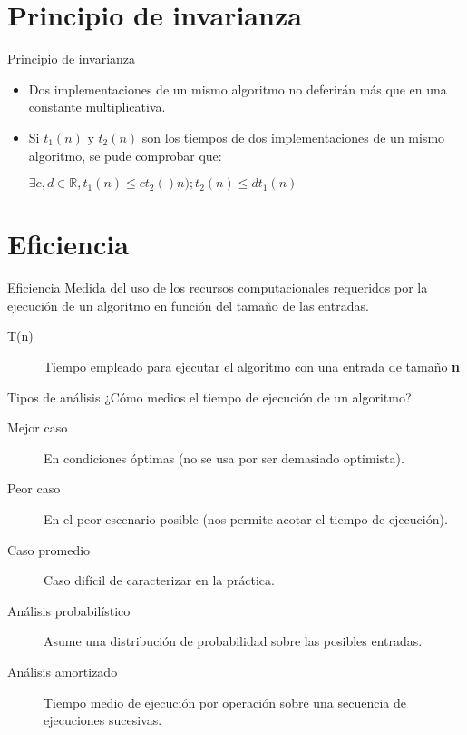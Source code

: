 \section{Principio de invarianza}

\begin{frame}[c]{Principio de invarianza}
  \begin{itemize}
    \item Dos implementaciones de un mismo algoritmo no deferirán más
      que en una constante multiplicativa.
    \pausa
    \item Si $t_1(n)$ y $t_2(n)$ son los tiempos de dos implementaciones
      de un mismo algoritmo, se pude comprobar que:

      \vspace{\baselineskip}
      $\exists c,d \in \mathbb{R}, t_1(n) \leq ct_2()n); t_2(n) \leq dt_1(n)$
  \end{itemize}
\end{frame}

\section{Eficiencia}

\begin{frame}[c]{Eficiencia}
  Medida del uso de los recursos computacionales
  requeridos por la ejecución de un algoritmo en función
  del tamaño de las entradas.

  \vspace{\baselineskip}
  \begin{description}
    \item[T(n)] Tiempo empleado para ejecutar el algoritmo con una entrada
      de tamaño \textbf{n}
  \end{description}
\end{frame}

\begin{frame}[c]{Tipos de análisis}
  ¿Cómo medios el tiempo de ejecución de un algoritmo?

  \vspace{\baselineskip}
  \begin{description}
    \item[Mejor caso] En condiciones óptimas (no se usa por ser
      demasiado optimista).
    \pausa
    \item[Peor caso] En el peor escenario posible (nos permite acotar
      el tiempo de ejecución).
    \pausa
    \item[Caso promedio] Caso difícil de caracterizar en la práctica.
    \pausa
    \item[Análisis probabilístico] Asume una distribución de probabilidad
      sobre las posibles entradas.
    \pausa
    \item[Análisis amortizado] Tiempo medio de ejecución por operación
      sobre una secuencia de ejecuciones sucesivas.
  \end{description}
\end{frame}

